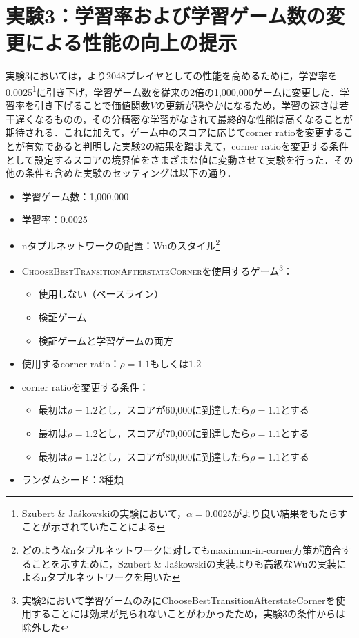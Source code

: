 \documentclass{suribt}
\begin{document}
\section{実験3：学習率および学習ゲーム数の変更による性能の向上の提示}
実験3においては，より2048プレイヤとしての性能を高めるために，学習率を0.0025\footnote{Szubert \& Ja\'{s}kowskiの実験において，${\alpha}=0.0025$がより良い結果をもたらすことが示されていたことによる}に引き下げ，学習ゲーム数を従来の2倍の1,000,000ゲームに変更した．学習率を引き下げることで価値関数$V$の更新が穏やかになるため，学習の速さは若干遅くなるものの，その分精密な学習がなされて最終的な性能は高くなることが期待される．これに加えて，ゲーム中のスコアに応じてcorner ratioを変更することが有効であると判明した実験2の結果を踏まえて，corner ratioを変更する条件として設定するスコアの境界値をさまざまな値に変動させて実験を行った．その他の条件も含めた実験のセッティングは以下の通り．

\begin{itemize}
\item 学習ゲーム数：1,000,000
\item 学習率：0.0025
\item nタプルネットワークの配置：Wuのスタイル\footnote{どのようなnタプルネットワークに対してもmaximum-in-corner方策が適合することを示すために，Szubert \& Ja\'{s}kowskiの実装よりも高級なWuの実装によるnタプルネットワークを用いた}
\item \textsc{ChooseBestTransitionAfterstateCorner}を使用するゲーム\footnote{実験2において学習ゲームのみにChooseBestTransitionAfterstateCornerを使用することには効果が見られないことがわかったため，実験3の条件からは除外した}：
\begin{itemize}
\item 使用しない（ベースライン）
\item 検証ゲーム
\item 検証ゲームと学習ゲームの両方
\end{itemize}
\item 使用するcorner ratio：${\rho}=1.1 \text{もしくは} 1.2$
\item corner ratioを変更する条件：
\begin{itemize}
\item 最初は${\rho}=1.2$とし，スコアが60,000に到達したら${\rho}=1.1$とする
\item 最初は${\rho}=1.2$とし，スコアが70,000に到達したら${\rho}=1.1$とする
\item 最初は${\rho}=1.2$とし，スコアが80,000に到達したら${\rho}=1.1$とする
\end{itemize}
\item ランダムシード：3種類
\end{itemize}
\end{document}

